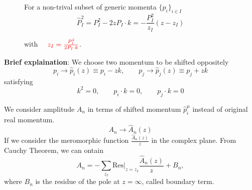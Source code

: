 \documentclass{beamer}
\begin{document}
\begin{frame}
\begin{figure}
\begin{minipage}{0.45\textwidth}
\begin{tikzpicture}[scale=0.7,x=0.75pt,y=0.75pt,yscale=-1,xscale=1]
\end{tikzpicture}
    \end{minipage}
    \hspace{1em}
    \begin{minipage}{0.45\textwidth}
        For a non-trival subset of generic momenta $\{p_i\}_{i\in I}$
    \begin{equation*}
        \hat{P}_I^2=P_I^2 -2zP_I\cdot k=-\frac{P_I^2}{z_I}(z-z_I) 
    \end{equation*}

    with $\textcolor{red}{\quad z_I=\frac{P_I^2}{2P_I\cdot k}}$.  
    \end{minipage}
\end{figure} 
\end{frame}

\begin{frame}
    
    \textbf{Brief explaination}: We choose two momentum to be shifted oppositely 
    \begin{equation*}
        p_i\rightarrow\hat{p}_i(z)\equiv p_i-zk,\qquad p_j\rightarrow\hat{p}_j(z)\equiv p_j+zk
    \end{equation*}
    satisfying 
    \begin{equation*}
        k^2=0,\qquad p_i\cdot k=0,\qquad p_j\cdot k=0
    \end{equation*}
    
    We consider amplitude $A_n$ in terms of shifted momentum $\hat{p}_i^\mu$ instead of original real momentum. 
    \begin{equation*}
        A_n \longrightarrow \hat{A}_n(z)
    \end{equation*}
    \pause
    If we consider the meromorphic function $\frac{\hat{A}_n(z)}{z}$ in the complex plane.
    From Cauchy Theorem, we can ontain
    \begin{equation*}
        A_n=-\sum_{z_I}\textrm{Res}|_{z=z_I}\frac{\hat{A}_n(z)}{z}+B_n,
    \end{equation*}
    where $B_n$ is the residue of the pole at $z=\infty$, called boundary term.
\end{frame}
\end{document}
